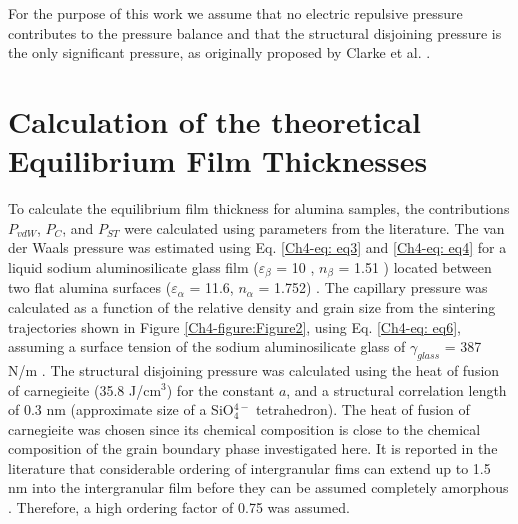 For the purpose of this work we assume that no electric repulsive pressure contributes to the pressure balance and that the structural disjoining pressure is the only significant pressure, as originally proposed by Clarke et al. \cite{Clarke1993}. 

\section{Calculation of the theoretical Equilibrium Film Thicknesses}
To calculate the equilibrium film thickness for alumina samples, the contributions $P_{vdW}$, $P_{C}$, and $P_{ST}$ were calculated using parameters from the literature. The van der Waals pressure was estimated using Eq. \ref{Ch4-eq: eq3} and \ref{Ch4-eq: eq4} for a liquid sodium aluminosilicate glass film ($\varepsilon_{\beta}$ = 10 \cite{Hsieh1996}, $n_{\beta}$ = 1.51 \cite{Day1962}) located between two flat alumina surfaces ($\varepsilon_{\alpha}$ = 11.6, $n_{\alpha}$ = 1.752) \cite{Clarke1987}. The capillary pressure was calculated as a function of the relative density and grain size from the sintering trajectories shown in Figure \ref{Ch4-figure:Figure2}, using Eq. \ref{Ch4-eq: eq6}, assuming a surface tension of the sodium aluminosilicate glass of $\gamma_{glass}$ = 387 N/m \cite{Lyon1942}. The structural disjoining pressure was calculated using the heat of fusion of carnegieite (35.8 J/cm$^{3}$) for the constant $a$, and a structural correlation length of 0.3 nm (approximate size of a SiO$_{4}^{4-}$ tetrahedron). The heat of fusion of carnegieite was chosen since its chemical composition is close to the chemical composition of the grain boundary phase investigated here. It is reported in the literature that considerable ordering of intergranular fims can extend up to 1.5 nm into the intergranular film before they can be assumed completely amorphous \cite{Zhang2005}. Therefore, a high ordering factor of 0.75 was assumed.

